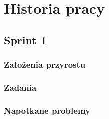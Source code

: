 \chapter{Historia pracy}

\section{Sprint 1}
\subsection{Założenia przyrostu}
\subsection{Zadania}
\subsection{Napotkane problemy}